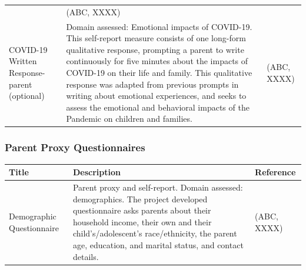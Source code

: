 \documentclass[]{book}
\begin{document}
\begin{longtable}[]{@{}lll@{}}
\begin{minipage}[t]{0.32\columnwidth}
\end{minipage} & \begin{minipage}[t]{0.27\columnwidth}\raggedright
(ABC, XXXX)\strut
\end{minipage}\tabularnewline
\begin{minipage}[t]{0.32\columnwidth}\raggedright
COVID-19 Written Response- parent (optional)\strut
\end{minipage} & \begin{minipage}[t]{0.32\columnwidth}\raggedright
Domain assessed: Emotional impacts of COVID-19. This self-report measure consists of one long-form qualitative response, prompting a parent to write continuously for five minutes about the impacts of COVID-19 on their life and family. This qualitative response was adapted from previous prompts in writing about emotional experiences, and seeks to assess the emotional and behavioral impacts of the Pandemic on children and families.\strut
\end{minipage} & \begin{minipage}[t]{0.27\columnwidth}\raggedright
(ABC, XXXX)\strut
\end{minipage}\tabularnewline
\bottomrule
\end{longtable}

\hypertarget{parent-proxy-questionnaires}{%
\subsubsection{Parent Proxy Questionnaires}\label{parent-proxy-questionnaires}}

\begin{longtable}[]{@{}lll@{}}
\toprule
\begin{minipage}[b]{0.32\columnwidth}\raggedright
Title\strut
\end{minipage} & \begin{minipage}[b]{0.32\columnwidth}\raggedright
Description\strut
\end{minipage} & \begin{minipage}[b]{0.27\columnwidth}\raggedright
Reference\strut
\end{minipage}\tabularnewline
\midrule
\endhead
\begin{minipage}[t]{0.32\columnwidth}\raggedright
Demographic Questionnaire\strut
\end{minipage} & \begin{minipage}[t]{0.32\columnwidth}\raggedright
Parent proxy and self-report. Domain assessed: demographics. The project developed questionnaire asks parents about their household income, their own and their child's/adolescent's race/ethnicity, the parent age, education, and marital status, and contact details.\strut
\end{minipage} & \begin{minipage}[t]{0.27\columnwidth}\raggedright
(ABC, XXXX)\strut
\end{minipage}\tabularnewline
\bottomrule
\end{longtable}
\end{document}
